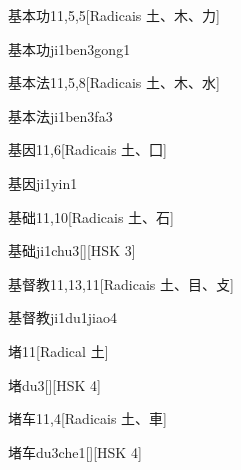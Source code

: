 \begin{entry}{基本功}{11,5,5}[Radicais ⼟、⽊、⼒]
  \begin{phonetics}{基本功}{ji1ben3gong1}
  \end{phonetics}
\end{entry}

\begin{entry}{基本法}{11,5,8}[Radicais ⼟、⽊、⽔]
  \begin{phonetics}{基本法}{ji1ben3fa3}
  \end{phonetics}
\end{entry}

\begin{entry}{基因}{11,6}[Radicais ⼟、⼞]
  \begin{phonetics}{基因}{ji1yin1}
  \end{phonetics}
\end{entry}

\begin{entry}{基础}{11,10}[Radicais ⼟、⽯]
  \begin{phonetics}{基础}{ji1chu3}[][HSK 3]
  \end{phonetics}
\end{entry}

\begin{entry}{基督教}{11,13,11}[Radicais ⼟、⽬、⽁]
  \begin{phonetics}{基督教}{ji1du1jiao4}
  \end{phonetics}
\end{entry}

\begin{entry}{堵}{11}[Radical ⼟]
  \begin{phonetics}{堵}{du3}[][HSK 4]
  \end{phonetics}
\end{entry}

\begin{entry}{堵车}{11,4}[Radicais ⼟、⾞]
  \begin{phonetics}{堵车}{du3che1}[][HSK 4]
  \end{phonetics}
\end{entry}

